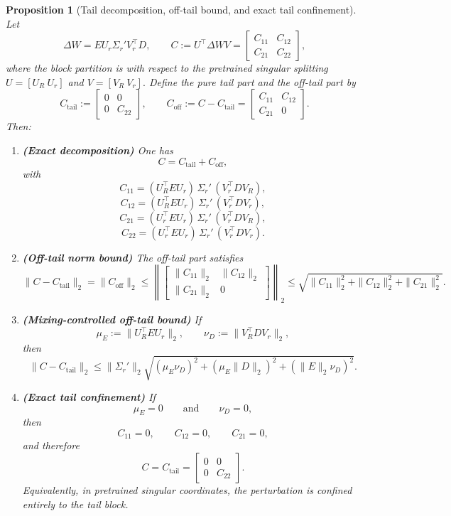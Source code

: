 \documentclass[11pt]{article}
\newtheorem{proposition}{Proposition}
\begin{document}
\begin{proposition}[Tail decomposition, off-tail bound, and exact tail confinement]
\label{prop:tail-confinement}
Let
\[
\Delta W = E U_r \Sigma_r' V_r^\top D,
\qquad
C := U^\top \Delta W V
=
\begin{bmatrix}
C_{11} & C_{12}\\
C_{21} & C_{22}
\end{bmatrix},
\]
where the block partition is with respect to the pretrained singular splitting
\(
U=[U_R\ U_r]
\)
and
\(
V=[V_R\ V_r].
\)
Define the pure tail part and the off-tail part by
\[
C_{\mathrm{tail}}
:=
\begin{bmatrix}
0 & 0\\
0 & C_{22}
\end{bmatrix},
\qquad
C_{\mathrm{off}}
:=
C-C_{\mathrm{tail}}
=
\begin{bmatrix}
C_{11} & C_{12}\\
C_{21} & 0
\end{bmatrix}.
\]
Then:
\begin{enumerate}
    \item[(i)] \textbf{(Exact decomposition)} One has
    \[
    C = C_{\mathrm{tail}} + C_{\mathrm{off}},
    \]
    with
    \[
    C_{11} = (U_R^\top E U_r)\,\Sigma_r'\,(V_r^\top D V_R),
    \]
    \[
    C_{12} = (U_R^\top E U_r)\,\Sigma_r'\,(V_r^\top D V_r),
    \]
    \[
    C_{21} = (U_r^\top E U_r)\,\Sigma_r'\,(V_r^\top D V_R),
    \]
    \[
    C_{22} = (U_r^\top E U_r)\,\Sigma_r'\,(V_r^\top D V_r).
    \]

    \item[(ii)] \textbf{(Off-tail norm bound)} The off-tail part satisfies
    \[
    \|C-C_{\mathrm{tail}}\|_2
    =
    \|C_{\mathrm{off}}\|_2
    \le
    \left\|
    \begin{bmatrix}
    \|C_{11}\|_2 & \|C_{12}\|_2\\
    \|C_{21}\|_2 & 0
    \end{bmatrix}
    \right\|_2
    \le
    \sqrt{
    \|C_{11}\|_2^2+\|C_{12}\|_2^2+\|C_{21}\|_2^2
    }.
    \]

    \item[(iii)] \textbf{(Mixing-controlled off-tail bound)} If
    \[
    \mu_E := \|U_R^\top E U_r\|_2,
    \qquad
    \nu_D := \|V_R^\top D V_r\|_2,
    \]
    then
    \[
    \|C-C_{\mathrm{tail}}\|_2
    \le
    \|\Sigma_r'\|_2
    \sqrt{
    (\mu_E\nu_D)^2
    +
    (\mu_E\|D\|_2)^2
    +
    (\|E\|_2\nu_D)^2
    }.
    \]

    \item[(iv)] \textbf{(Exact tail confinement)} If
    \[
    \mu_E = 0
    \qquad\text{and}\qquad
    \nu_D = 0,
    \]
    then
    \[
    C_{11}=0,\qquad C_{12}=0,\qquad C_{21}=0,
    \]
    and therefore
    \[
    C=C_{\mathrm{tail}}
    =
    \begin{bmatrix}
    0 & 0\\
    0 & C_{22}
    \end{bmatrix}.
    \]
    Equivalently, in pretrained singular coordinates, the perturbation is confined entirely to the tail block.
\end{enumerate}
\end{proposition}
\end{document}
